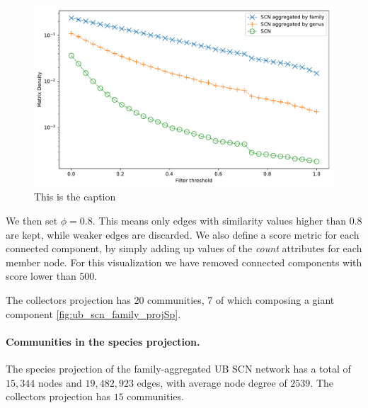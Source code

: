 \begin{figure}[!ht]
  	\centering
    \includegraphics[width=\linewidth]{figures/casestudy_ub/scn_projCol_filter_thresh.pdf}
    \caption{ This is the caption }
    \label{fig:ub_scn_projCol_filter_thresh}
\end{figure}

We then set $\phi = 0.8$.
This means only edges with similarity values higher than $0.8$ are kept, while weaker edges are discarded.
We also define a score metric for each connected component, by simply adding up values of the \textit{count} attributes for each member node.
For this visualization we have removed connected components with score lower than $500$.


The collectors projection has $20$ communities, $7$ of which composing a giant component \ref{fig:ub_scn_family_projSp}.


\paragraph*{Communities in the species projection.}
The species projection of the family-aggregated UB SCN network has a total of $15,344$ nodes and $19,482,923$ edges, with average node degree of $2539$.
The collectors projection has $15$ communities.








